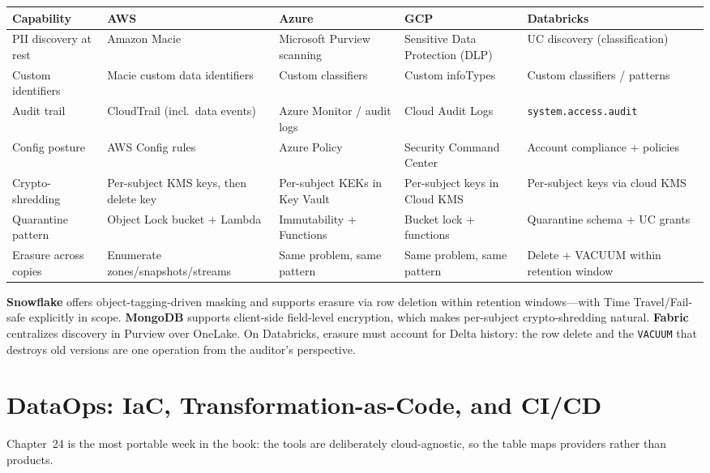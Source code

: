 \begin{center}
\footnotesize
\begin{tabular}{@{}p{2.4cm}p{2.9cm}p{2.9cm}p{2.9cm}p{2.9cm}@{}}
\toprule
\textbf{Capability} & \textbf{AWS} & \textbf{Azure} & \textbf{GCP} & \textbf{Databricks} \\
\midrule
PII discovery at rest & Amazon Macie & Microsoft Purview scanning & Sensitive Data Protection (DLP) & UC discovery (classification) \\
Custom identifiers & Macie custom data identifiers & Custom classifiers & Custom infoTypes & Custom classifiers / patterns \\
Audit trail & CloudTrail (incl.\ data events) & Azure Monitor / audit logs & Cloud Audit Logs & \texttt{system.access.audit} \\
Config posture & AWS Config rules & Azure Policy & Security Command Center & Account compliance + policies \\
Crypto-shredding & Per-subject KMS keys, then delete key & Per-subject KEKs in Key Vault & Per-subject keys in Cloud KMS & Per-subject keys via cloud KMS \\
Quarantine pattern & Object Lock bucket + Lambda & Immutability + Functions & Bucket lock + functions & Quarantine schema + UC grants \\
\addlinespace
Erasure across copies & Enumerate zones/snapshots/streams & Same problem, same pattern & Same problem, same pattern & Delete + VACUUM within retention window \\
\bottomrule
\end{tabular}
\end{center}

\noindent \textbf{Snowflake} offers object-tagging-driven masking and supports erasure via row
deletion within retention windows---with Time Travel/Fail-safe explicitly in scope.
\textbf{MongoDB} supports client-side field-level encryption, which makes per-subject
crypto-shredding natural. \textbf{Fabric} centralizes discovery in Purview over OneLake. On
Databricks, erasure must account for Delta history: the row delete and the \texttt{VACUUM} that
destroys old versions are one operation from the auditor's perspective.

\section{DataOps: IaC, Transformation-as-Code, and CI/CD}
%
Chapter~24 is the most portable week in the book: the tools are deliberately cloud-agnostic, so
the table maps providers rather than products.

